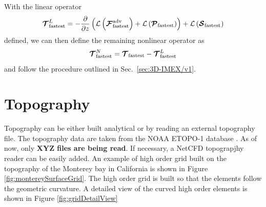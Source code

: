 \documentclass{article}
\begin{document}
{
With the linear operator
\[
\boldsymbol{{\mathcal{T}}}^L_{\mathrm{fastest}} = - \frac{\partial }{\partial z} \left( \mathcal{L}\left(\boldsymbol{{\mathcal{F}}}^{\mathrm{adv}}_{\mathrm{fastest}}\right) + \mathcal{L}\left(\boldsymbol{{\mathcal{P}}}_{\mathrm{fastest}}\right) \right) + \mathcal{L}\left( \boldsymbol{{\mathcal{S}}}_{\mathrm{fastest}}\right)
\]
defined, we can then define the remaining nonlinear operator as 
\[
\boldsymbol{{\mathcal{T}}}^N_{\mathrm{fastest}} =\boldsymbol{{\mathcal{T}}}_{\mathrm{fastest}} - \boldsymbol{{\mathcal{T}}}^L_{\mathrm{fastest}}
\]
and follow the procedure outlined in Sec.\ \ref{sec:3D-IMEX/v1}. 

\section{Topography}
Topography can be either built analytical or by reading an external topography file. The topography data are taken from the NOAA ETOPO-1 database \cite{etopo1}. As of now, only {\bf XYZ files are being read}. If necessary, a NetCFD topograpjhy reader can be easily added.
An example of high order grid built on the topography of the Monterey bay in California is shown in Figure \ref{fig:montereySurfaceGrid}. The high order grid is built so that the elements follow the geometric curvature. A detailed view of the curved high order elements is shown in Figure \ref{fig:gridDetailView}

}
\end{document}

